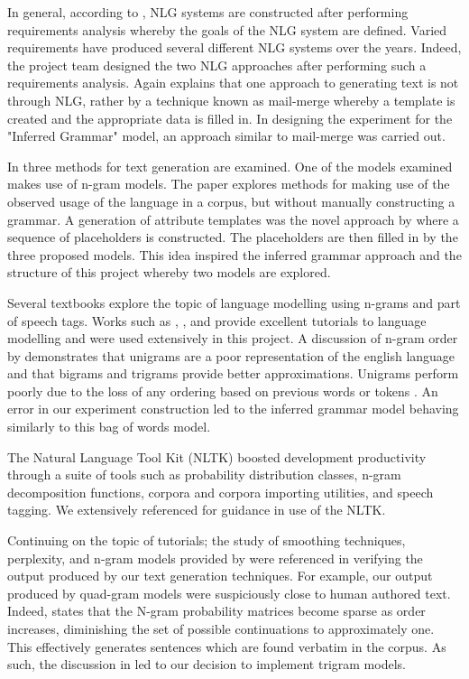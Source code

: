 \documentclass[ai15_group61_report.tex]{subfiles}
\begin{document}
In general, according to \cite{Reiter:2000:BNL:331955}, NLG systems are constructed after performing requirements analysis whereby the goals of the NLG system are defined. Varied requirements have produced several different NLG systems over the years. Indeed, the project team designed the two NLG approaches after performing such a requirements analysis. Again \cite{Reiter:2000:BNL:331955} explains that one approach to generating text is not through NLG, rather by a technique known as mail-merge whereby a template is created and the appropriate data is filled in. In designing the experiment for the "Inferred Grammar" model, an approach similar to mail-merge was carried out.

In \cite{Ratnaparkhi00} three methods for text generation are examined. One of the models examined makes use of n-gram models. The paper explores methods for making use of the observed usage of the language in a corpus, but without manually constructing a grammar. A generation of attribute templates was the novel approach by \cite{Ratnaparkhi00} where a sequence of placeholders is constructed. The placeholders are then filled in by the three proposed models. This idea inspired the inferred grammar approach and the structure of this project whereby two models are explored.

Several textbooks explore the topic of language modelling using n-grams and part of speech tags. Works such as \cite{Jurafsky2000}, \cite{RussellNorvigAIBook3rd}, and \cite{Chen98anempirical} provide excellent tutorials to language modelling and were used extensively in this project. A discussion of n-gram order by \cite{RussellNorvigAIBook3rd} demonstrates that unigrams are a poor representation of the english language and that bigrams and trigrams provide better approximations. Unigrams perform poorly due to the loss of any ordering based on previous words or tokens \cite{RussellNorvigAIBook3rd}. An error in our experiment construction led to the inferred grammar model behaving similarly to this bag of words model.

The Natural Language Tool Kit (NLTK) boosted development productivity through a suite of tools such as probability distribution classes, n-gram decomposition functions, corpora and corpora importing utilities, and speech tagging. We extensively referenced \cite{NLTKBook09} for guidance in use of the NLTK. 

Continuing on the topic of tutorials; the study of smoothing techniques, perplexity, and n-gram models provided by \cite{Jurafsky2000} were referenced in verifying the output produced by our text generation techniques. For example, our output produced by quad-gram models were suspiciously close to human authored text. Indeed, \cite{Jurafsky2000} states that the N-gram probability matrices become sparse as order increases, diminishing the set of possible continuations to approximately one. This effectively generates sentences which are found verbatim in the corpus. As such, the discussion in \cite{Jurafsky2000} led to our decision to implement trigram models. 
\end{document}
